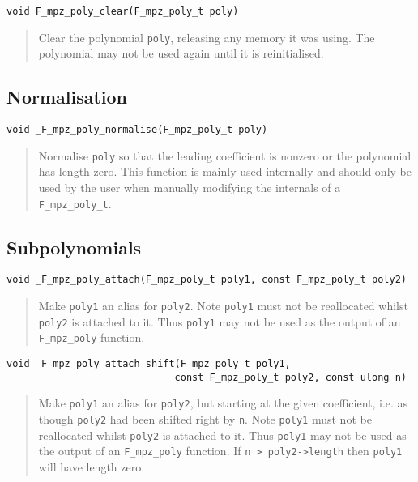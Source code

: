\documentclass[a4paper,10pt]{article}
\newcommand{\code}{\lstinline}
\begin{document}
\begin{lstlisting}
void F_mpz_poly_clear(F_mpz_poly_t poly)
\end{lstlisting}
\begin{quote}
Clear the polynomial \code{poly}, releasing any memory it was using. The polynomial may not be used again 
until it is reinitialised.
\end{quote}

\subsection{Normalisation}

\begin{lstlisting}
void _F_mpz_poly_normalise(F_mpz_poly_t poly)
\end{lstlisting}
\begin{quote}
Normalise \code{poly} so that the leading coefficient is nonzero or the polynomial has length zero. This 
function is mainly used internally and should only be used by the user when manually modifying the
internals of a \code{F_mpz_poly_t}.
\end{quote}

\subsection{Subpolynomials}

\begin{lstlisting}
void _F_mpz_poly_attach(F_mpz_poly_t poly1, const F_mpz_poly_t poly2)
\end{lstlisting}
\begin{quote}
Make \code{poly1} an alias for \code{poly2}. Note \code{poly1} must not be reallocated whilst \code{poly2} 
is attached to it. Thus \code{poly1} may not be used as the output of an \code{F_mpz_poly} function.
\end{quote}

\begin{lstlisting}
void _F_mpz_poly_attach_shift(F_mpz_poly_t poly1, 
                             const F_mpz_poly_t poly2, const ulong n)
\end{lstlisting}
\begin{quote}
Make \code{poly1} an alias for \code{poly2}, but starting at the given coefficient, i.e. as though 
\code{poly2} had been shifted right by \code{n}. Note \code{poly1} must not be reallocated whilst 
\code{poly2} is attached to it. Thus \code{poly1} may not be used as the output of an \code{F_mpz_poly} 
function. If \code{n > poly2->length} then \code{poly1} will have length zero.
\end{quote}
\end{document}
